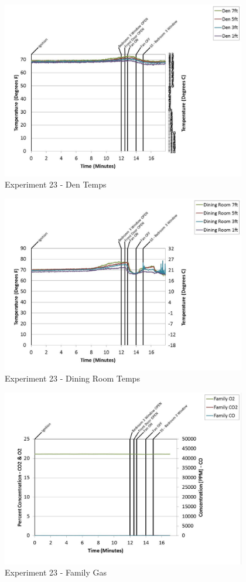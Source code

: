\documentclass{article}
\begin{document}
\begin{appendices}
	\clearpage

	\begin{figure}[h!]
		\centering
		\includegraphics[height=3.05in]{0_Images/Results_Charts/Exp_23_Charts/DenTemps.pdf}
		\caption{Experiment 23 - Den Temps}
	\end{figure}
 

	\begin{figure}[h!]
		\centering
		\includegraphics[height=3.05in]{0_Images/Results_Charts/Exp_23_Charts/DiningRoomTemps.pdf}
		\caption{Experiment 23 - Dining Room Temps}
	\end{figure}
 
	\clearpage

	\begin{figure}[h!]
		\centering
		\includegraphics[height=3.05in]{0_Images/Results_Charts/Exp_23_Charts/FamilyGas.pdf}
		\caption{Experiment 23 - Family Gas}
	\end{figure}
 


\end{appendices}
\end{document}

